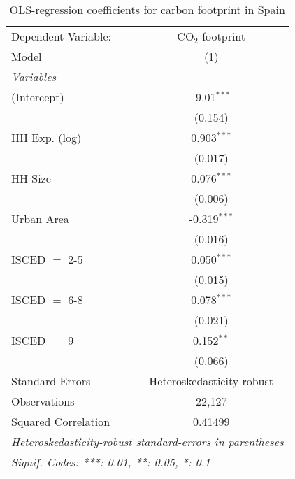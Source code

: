 
\begin{table}[htbp!]
   \centering
   \small
   \begin{adjustbox}{width = 1\textwidth, max height = 0.95\textheight, center}
      \begin{threeparttable}[b]
         \caption{\label{tab:OLS_2_ESP} OLS-regression coefficients for carbon footprint in Spain}
         \begin{tabular}{lc}
            \tabularnewline \midrule \midrule
            Dependent Variable: & CO$_{2}$ footprint\\  
            Model               & (1)\\  
            \midrule
            \emph{Variables}\\
            (Intercept)         & -9.01$^{***}$\\   
                                & (0.154)\\   
            HH Exp. (log)       & 0.903$^{***}$\\   
                                & (0.017)\\   
            HH Size             & 0.076$^{***}$\\   
                                & (0.006)\\   
            Urban Area          & -0.319$^{***}$\\   
                                & (0.016)\\   
            ISCED $=$ 2-5       & 0.050$^{***}$\\   
                                & (0.015)\\   
            ISCED $=$ 6-8       & 0.078$^{***}$\\   
                                & (0.021)\\   
            ISCED $=$ 9         & 0.152$^{**}$\\   
                                & (0.066)\\   
            \midrule 
            Standard-Errors     & Heteroskedasticity-robust \\   
            Observations        & 22,127\\  
            Squared Correlation & 0.41499\\  
            \midrule \midrule
            \multicolumn{2}{l}{\emph{Heteroskedasticity-robust standard-errors in parentheses}}\\
            \multicolumn{2}{l}{\emph{Signif. Codes: ***: 0.01, **: 0.05, *: 0.1}}\\
         \end{tabular}
         

\end{threeparttable}
\end{adjustbox}
\end{table}
